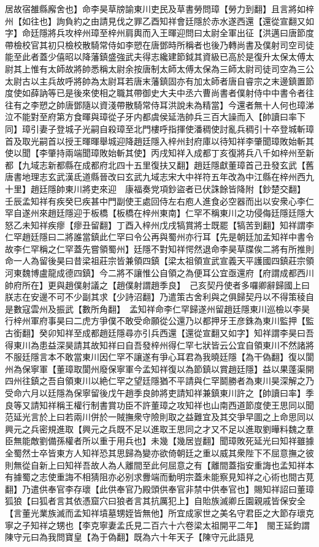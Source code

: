居故宿雒縣廨舍也】命李昊草牓諭東川吏民及草書勞問璋【勞力到翻】且言將如梓州【如往也】詢負約之由請見伐之罪乙酉知祥會廷隱於赤水遂西還【還從宣翻又如字】命廷隱將兵攻梓州璋至梓州肩輿而入王暉迎問曰太尉全軍出征【洪邁曰唐節度帶檢校官其初只檢校散騎常侍如李愬在唐鄧時所稱者也後乃轉尚書及僕射司空司徒能至此者蓋少僖昭以降藩鎮盛強武夫得志纔建節鉞其資級已高於是復升太保太傅太尉其上惟有太師故將帥悉稱太尉余按唐制太師太傅太保為三師太尉司徒司空為三公太尉古以主兵故呼將帥為太尉耳若唐末藩鎮固亦有加太師者唐自睿宗之末邊鎮置節度使如薛訥等已是後來使相之職其帶御史大夫中丞六曹尚書者僕射侍中中書令者往往有之李愬之帥唐鄧隨以資淺帶散騎常侍耳洪說未為精當】今還者無十人何也璋涕泣不能對至府第方食暉與璋從子牙内都虞侯延浩帥兵三百大譟而入【帥讀曰率下同】璋引妻子登城子光嗣自殺璋至北門樓呼指揮使潘稠使討亂兵稠引十卒登城斬璋首及取光嗣首以授王暉暉舉城迎降趙廷隱入梓州封府庫以待知祥李肇聞璋敗始斬其使以聞【李肇持兩端聞璋敗始斬其使】丙戌知祥入成都丁亥復將兵八千如梓州至新都【九域志新都縣在成都府北四十五里復扶又翻】趙廷隱獻董璋首己丑發玄武【舊唐書地理志玄武漢氐道縣晉改曰玄武九域志宋大中祥符五年改為中江縣在梓州西九十里】趙廷隱帥東川將吏來迎　康福奏党項鈔盜者已伏誅餘皆降附【鈔楚交翻】　壬辰孟知祥有疾癸巳疾甚中門副使王處回侍左右庖人進食必空器而出以安衆心李仁罕自遂州來趙廷隱迎于板橋【板橋在梓州東南】仁罕不稱東川之功侵侮廷隱廷隱大怒乙未知祥疾瘳【瘳丑留翻】丁酉入梓州戊戌犒賞將士既罷【犒苦到翻】知祥謂李仁罕趙廷隱曰二將誰當鎮此仁罕曰令公再與蜀州亦行耳【先是朝廷加孟知祥中書令故李仁罕稱之仁罕蓋先嘗領蜀州】廷隱不對知祥愕然退命李昊草牒俟二將有所推則命一人為留後昊曰昔梁祖莊宗皆兼領四鎮【梁太祖領宣武宣義天平護國四鎮莊宗領河東魏博盧龍成德四鎮】今二將不讓惟公自領之為便耳公宜亟還府【府謂成都西川帥府所在】更與趙僕射議之【趙僕射謂趙季良】　己亥契丹使者多囉卿辭歸國上曰朕志在安邊不可不少副其求【少詩沼翻】乃遣策古舍利與之俱歸契丹以不得策稜自是數寇雲州及振武【數所角翻】　孟知祥命李仁罕歸遂州留趙廷隱東川巡檢以李昊行梓州軍府事昊曰二虎方爭僕不敢受命願從公還乃以都押牙王彦銖為東川監押【監古銜翻】癸卯知祥至成都趙廷隱尋亦引兵西還【還從宣翻又如字】知祥謂李昊曰吾得東川為患益深昊請其故知祥曰自吾發梓州得仁罕七狀皆云公宜自領東川不然諸將不服廷隱言本不敢當東川因仁罕不讓遂有爭心耳君為我曉廷隱【為干偽翻】復以閬州為保寧軍【董璋取閬州廢保寧軍今孟知祥復以為節鎮以賞趙廷隱】益以果蓬渠開四州往鎮之吾自領東川以絶仁罕之望廷隱猶不平請與仁罕鬬勝者為東川昊深解之乃受命六月以廷隱為保寧留後戊午趙季良帥將吏請知祥兼鎮東川許之【帥讀曰率】季良等又請知祥稱王權行制書賞功臣不許董璋之攻知祥也山南西道節度使王思同以聞范延光言於上曰若兩川併於一賊撫衆守險則取之益難宜及其交爭早圖之上命思同以興元之兵密規進取【興元之兵既不足以進取王思同之才又不足以進取劉曄料魏之羣臣無能敵劉備孫權者所以重于用兵也】未幾【幾居豈翻】聞璋敗死延光曰知祥雖據全蜀然士卒皆東方人知祥恐其思歸為變亦欲倚朝廷之重以威其衆陛下不屈意撫之彼則無從自新上曰知祥吾故人為人離間至此何屈意之有【離間蓋指安重誨也孟知祥本有據蜀之志使重誨不相猜阻亦必别求釁端而動明宗蓋未能察見知祥之心術也間古莧翻】乃遣供奉官李存瓌【此供奉官乃殿頭供奉官非禁中供奉官也】賜知祥詔曰董璋狐狼【曰狐者言其依憑窟穴曰狼者言其抗厲犯上】自貽族滅卿丘園親戚皆保安全【言董光業族滅而孟知祥墳墓甥姪皆無他】所宜成家世之美名守君臣之大節存瓌克寧之子知祥之甥也【李克寧妻孟氏見二百六十六卷梁太祖開平二年】　閩王延鈞謂陳守元曰為我問寶皇【為于偽翻】既為六十年天子【陳守元此語見